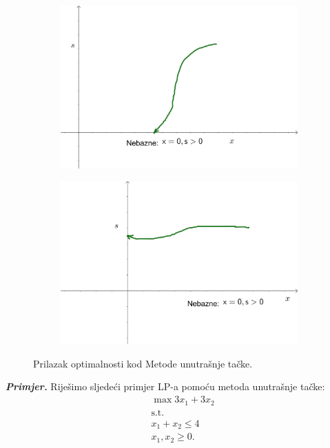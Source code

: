 \documentclass[a4paper, utf8, 11pt, colorlinks]{book}
\begin{document}
\begin{figure}
	\begin{subfigure}{.45\textwidth}
	\centering
	\includegraphics[width=.9\linewidth]{interior-3}  
\end{subfigure}
\begin{subfigure}{.45\textwidth}
	\centering
	\includegraphics[width=.9\linewidth]{interior-4}  
\end{subfigure}
  \caption{Prilazak optimalnosti kod Metode unutrašnje tačke.}
   \label{fig:optimality-approaching-interior}
\end{figure}
\emph{\textbf{Primjer.}} Riješimo sljedeći primjer LP-a pomoću metoda unutrašnje tačke:
\begin{align*}
	&\max 3 x_1 + 3 x_2 \\
	&\mbox{s.t.} \\
	& x_1 + x_2 \leq 4 \\
	& x_1, x_2 \geq 0.
\end{align*}
\end{document}
